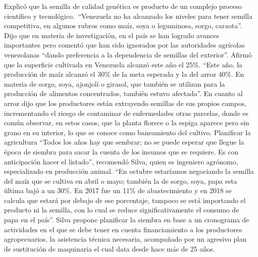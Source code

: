 \documentclass{article}%
\begin{document}
\newline%
%
Explicó que la semilla de calidad genética es producto de un complejo proceso científico y tecnológico.~“Venezuela no ha alcanzado los niveles para tener semilla competitiva, en algunos rubros como maíz, soya o leguminosa, sorgo, caraota”.%
\newline%
%
Dijo que en materia de investigación, en el país se han logrado avances importantes pero comentó que han sido ignorados por las autoridades agrícolas venezolanas “dando preferencia a la dependencia de semillas del exterior”.%
\newline%
%
Afirmó que la superficie cultivada en Venezuela alcanzó este año el 25\%.\newline%
\newline%
“Este año, la producción de maíz alcanzó el 30\% de la meta esperada y la del arroz 40\%. En materia de sorgo, soya, ajonjolí o girasol, que también se utilizan para la producción de alimentos concentrados, también estuvo afectada”.%
\newline%
%
En cuanto al arroz dijo que los productores están extrayendo semillas de sus propios campos, incrementando el riesgo de contaminar de enfermedades otras parcelas, donde es común observar, en estos casos, que la planta florece o la espiga aparece pero sin grano en su interior, lo que se conoce como baneamiento del cultivo.%
\newline%
%
Planificar la agricultura%
\newline%
%
“Todos los años hay que sembrar; no se puede esperar que llegue la época de siembra para sacar la cuenta de los insumos que se requiere. Es con anticipación hacer el  listado”, recomendó Silva, quien es ingeniero agrónomo, especializado en producción animal.%
\newline%
%
“En octubre estaríamos negociando la semilla del maíz que se cultiva en abril o mayo; también la de sorgo, soya, papa esta última bajó a un 30\%. En 2017 fue un 11\% de abastecimiento y en 2018 se calcula que estará por debajo de ese porcentaje, tampoco se está importando el producto ni la semilla, con lo cual se reduce significativamente el consumo de papa en el país”.%
\newline%
%
Silva propone planificar la siembra en base a un cronograma de actividades en el que se debe tener en cuenta financiamiento a los productores agropecuarios, la asistencia técnica necesaria, acompañado por un agresivo plan de sustitución de maquinaria el cual data desde hace más de 25 años.%
\newline%
\end{document}
